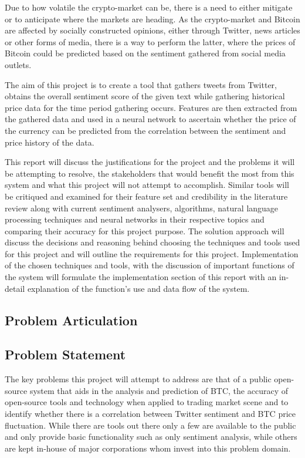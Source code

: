 \documentclass[oneside, 10pt]{article}
\begin{document}
	Due to how volatile the crypto-market can be, there is a need to either mitigate or to anticipate where the markets are heading. As the crypto-market and Bitcoin are affected by socially constructed opinions, either through Twitter, news articles or other forms of media, there is a way to perform the latter, where the prices of Bitcoin could be predicted based on the sentiment gathered from social media outlets.
	
	The aim of this project is to create a tool that gathers tweets from Twitter, obtains the overall sentiment score of the given text while gathering historical price data for the time period gathering occurs. Features are then extracted from the gathered data and used in a neural network to ascertain whether the price of the currency can be predicted from the correlation between the sentiment and price history of the data.
	
	This report will discuss the justifications for the project and the problems it will be attempting to resolve, the stakeholders that would benefit the most from this system and what this project will not attempt to accomplish. Similar tools will be critiqued and examined for their feature set and credibility in the literature review along with current sentiment analysers, algorithms, natural language processing techniques and neural networks in their respective topics and comparing their accuracy for this project purpose. 
	The solution approach will discuss the decisions and reasoning behind choosing the techniques and tools used for this project and will outline the requirements for this project.
	Implementation of the chosen techniques and tools, with the discussion of important functions of the system will formulate the implementation section of this report with an in-detail explanation of the function's use and data flow of the system.
	
	\newpage
	
	\begin{center}
		\section{Problem Articulation}\label{problem}
	\end{center}
		
		\subsection{Problem Statement}\label{statement}
		
		The key problems this project will attempt to address are that of a public open-source system that aids in the analysis and prediction of BTC, the accuracy of open-source tools and technology when applied to trading market scene and to identify whether there is a correlation between Twitter sentiment and BTC price fluctuation. While there are tools out there only a few are available to the public and only provide basic functionality such as only sentiment analysis, while others are kept in-house of major corporations whom invest into this problem domain.
		
\end{document}
